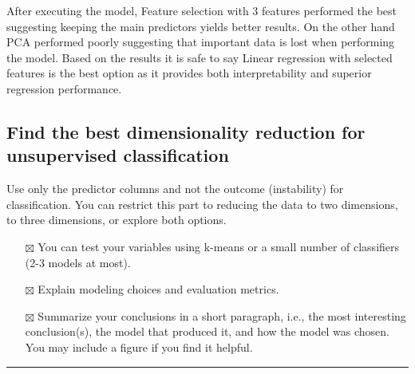 \documentclass[
  letterpaper,
  DIV=11,
  numbers=noendperiod]{scrartcl}
\providecommand{\tightlist}{%
  \setlength{\itemsep}{0pt}\setlength{\parskip}{0pt}}\usepackage{longtable,booktabs,array}
\begin{document}
After executing the model, Feature selection with 3 features performed
the best suggesting keeping the main predictors yields better results.
On the other hand PCA performed poorly suggesting that important data is
lost when performing the model. Based on the results it is safe to say
Linear regression with selected features is the best option as it
provides both interpretability and superior regression performance.

\subsection{Find the best dimensionality reduction for unsupervised
classification}\label{find-the-best-dimensionality-reduction-for-unsupervised-classification}

Use only the predictor columns and not the outcome (instability) for
classification. You can restrict this part to reducing the data to two
dimensions, to three dimensions, or explore both options.

\begin{itemize}
\tightlist
\item[$\boxtimes$]
  You can test your variables using k-means or a small number of
  classifiers (2-3 models at most).
\item[$\boxtimes$]
  Explain modeling choices and evaluation metrics.
\item[$\boxtimes$]
  Summarize your conclusions in a short paragraph, i.e., the most
  interesting conclusion(s), the model that produced it, and how the
  model was chosen. You may include a figure if you find it helpful.
\end{itemize}

\begin{center}\rule{0.5\linewidth}{0.5pt}\end{center}
\end{document}
